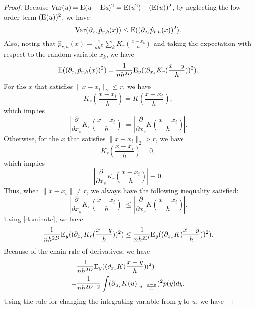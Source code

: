 \documentclass[aos,preprint]{imsart}
\theoremstyle{remark}
\begin{document}
\begin{appendix}
\begin{proof}\label{Derivatives' Variance for LKDE}
Because ${{\rm Var}}(u) = {\rm E}(u - {\rm E}u)^2 = {\rm E}(u^2) - ({\rm E}(u))^2$, by neglecting the low-order term $({\rm E}(u))^2$,  we have
\begin{equation}\label{step1}
{{\rm Var}}(\partial_{x_s} \hat{p}_{r,h}(x)) \leq {\rm E} ((\partial_{x_s} \hat{p}_{r,h}(x))^2) .
\end{equation}
Also, noting that $\hat{p}_{r,h}(x)=\frac{1}{n h^D} \sum_k K_r(\frac{x-x_k}{h})$ and taking the expectation with respect to the random variable $x_k$, we have
\begin{equation}\label{step2}
 {\rm E} ((\partial_{x_s} \hat{p}_{r,h}(x))^2) = \frac{1}{n h^{2D}} {\rm E}_y ((\partial_{x_s } K_r (\frac{x - y}{h}))^2).
\end{equation}
For the $x$ that satisfies $\|x-x_i\|_2\leq r$, we have 
\[
K_r(\frac{x-x_i}{h}) = K(\frac{x-x_i}{h}),
\]
which implies 
\[
|\frac{\partial }{\partial x_s }K_r(\frac{x-x_i}{h})| = | \frac{\partial }{\partial x_s }K(\frac{x-x_i}{h} )|.
\]
Otherwise, for the $x$ that satisfies $\|x-x_i\|_2> r$, we have
\[
K_r(\frac{x-x_i}{h}) =0,
\]
which implies
\[
|\frac{\partial }{\partial x_s }K_r(\frac{x-x_i}{h})| = 0.
\]
Thus, when $\|x-x_i\|\neq r$, we always have the following inequality satisfied:
\begin{equation}\label{dominate}
|\frac{\partial}{\partial x_s} K_r(\frac{x-x_i}{h}) | \leq |\frac{\partial}{\partial x_s} K(\frac{x-x_i}{h})|.
\end{equation}
Using \eqref{dominate}, %
we have
\begin{equation}\label{step3}
\frac{1}{n h^{2D}} {\rm E}_y ((\partial_{x_s } K_r (\frac{x - y}{h}))^2) \leq \frac{1}{n h^{2D}} {\rm E}_y ((\partial_{x_s } K(\frac{x - y}{h}))^2).
\end{equation}
Because of the chain rule of derivatives, we have
\begin{equation}\label{step4}
\begin{aligned}
&\frac{1}{n h^{2D}} {\rm E}_y ((\partial_{x_s} K(\frac{x - y}{h}))^2) \\
= &\frac{1}{n h^{2D+2}} \int (\partial_{u_s } K (u) |_{u=\frac{x - y}{h}})^2 p(y) dy.
\end{aligned}
\end{equation}
Using the rule for changing the integrating variable from $y$ to $u$, we have 

\end{proof}
\end{appendix}
\end{document}
